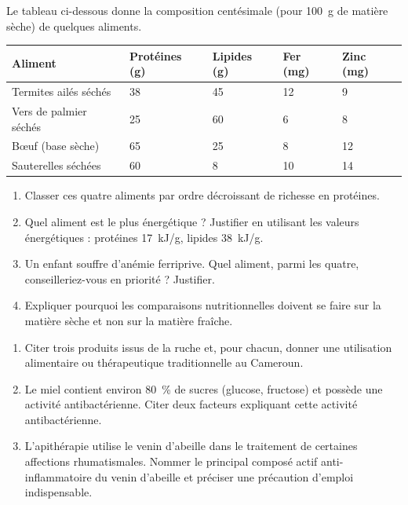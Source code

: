 \documentclass[11pt]{article}
\newcounter{popsec}
\newcounter{popsub}
\newcommand{\courssub}[1]{%
  \stepcounter{popsub}%
  \par\vspace{9pt}\noindent{\popxbold\fontsize{11.5}{13}\selectfont\color{popink}{\color{poporange}\thepopsec.\thepopsub}\hspace{6pt}#1}\par\nopagebreak\vspace{4pt}
}
\begin{document}
\courssub{Je m'entraîne}

\begin{exercice}
Le tableau ci-dessous donne la composition centésimale (pour \SI{100}{g} de matière sèche) de quelques aliments.
\begin{center}
\begin{tabularx}{\linewidth}{|l|X|X|X|X|}\hline
\rowcolor{popblueL} \textbf{Aliment} & \textbf{Protéines (g)} & \textbf{Lipides (g)} & \textbf{Fer (mg)} & \textbf{Zinc (mg)} \\ \hline
Termites ailés séchés & 38 & 45 & 12 & 9 \\ \hline
Vers de palmier séchés & 25 & 60 & 6 & 8 \\ \hline
Bœuf (base sèche) & 65 & 25 & 8 & 12 \\ \hline
Sauterelles séchées & 60 & 8 & 10 & 14 \\ \hline
\end{tabularx}
\end{center}
\begin{enumerate}
\item Classer ces quatre aliments par ordre décroissant de richesse en protéines.
\item Quel aliment est le plus énergétique ? Justifier en utilisant les valeurs énergétiques : protéines \SI{17}{kJ/g}, lipides \SI{38}{kJ/g}.
\item Un enfant souffre d'anémie ferriprive. Quel aliment, parmi les quatre, conseilleriez-vous en priorité ? Justifier.
\item Expliquer pourquoi les comparaisons nutritionnelles doivent se faire sur la matière sèche et non sur la matière fraîche.
\end{enumerate}
\end{exercice}

\begin{exercice}
\begin{enumerate}
\item Citer trois produits issus de la ruche et, pour chacun, donner une utilisation alimentaire ou thérapeutique traditionnelle au Cameroun.
\item Le miel contient environ \SI{80}{\percent} de sucres (glucose, fructose) et possède une activité antibactérienne. Citer deux facteurs expliquant cette activité antibactérienne.
\item L'apithérapie utilise le venin d'abeille dans le traitement de certaines affections rhumatismales. Nommer le principal composé actif anti-inflammatoire du venin d'abeille et préciser une précaution d'emploi indispensable.
\end{enumerate}
\end{exercice}
\end{document}
